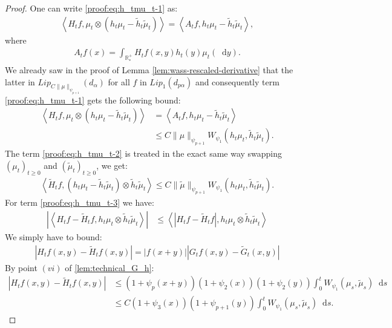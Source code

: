 \documentclass[11pt,a4paper]{article}
\newcommand{\RRP}{\mathbb{R}^+_*}
\newcommand{\Proc}[1]{\left(#1\right)_{t\geq 0}}
\newcommand{\brac}[1]{\left\langle#1\right\rangle}
\newcommand{\dd}{\mathop{}\!\mathrm{d}}
\begin{document}
\begin{proof}
    One can write \eqref{proof:eq:h_tmu_t-1} as:
    \begin{align*}
        \brac{H_tf,\mu_t \otimes\left(h_t\mu_t -  \tilde{h}_t \tilde{\mu}_t\right)} = \brac{A_tf,h_t\mu_t -  \tilde{h}_t \tilde{\mu}_t},
    \end{align*}
    where
    \begin{align*}
        A_tf(x) = \int_{\RRP} H_tf(x,y) h_t(y)\mu_t(\dd y).
    \end{align*}
    We already saw in the proof of Lemma \ref{lem:wass-rescaled-derivative} that the latter in $Lip_{C\|\mu\|_{\psi_{p+1}}}(d_{\alpha})$ for all $f$ in $Lip_1(d_{p\alpha})$ and consequently term \eqref{proof:eq:h_tmu_t-1} gets the following bound:
    \begin{align*}
        \brac{H_tf,\mu_t \otimes\left(h_t\mu_t -  \tilde{h}_t \tilde{\mu}_t\right)} &= \brac{A_tf,h_t\mu_t -  \tilde{h}_t \tilde{\mu}_t}\\
        &\leq C\| \mu\|_{\psi_{p+1}} W_{\psi_1}(h_t\mu_t, \tilde{h}_t \tilde{\mu}_t).
    \end{align*}
    The term \eqref{proof:eq:h_tmu_t-2} is treated in the exact same way swapping $\Proc{\mu_t}$ and $\Proc{\tilde{\mu}_t}$, we get:
    \begin{align*}
        \brac{\tilde{H}_tf,\left(h_t\mu_t-\tilde{h}_t\tilde{\mu}_t\right) \otimes \tilde{h}_t \tilde{\mu}_t} \leq C\| \tilde{\mu}\|_{\psi_{p+1}} W_{\psi_1}(h_t\mu_t, \tilde{h}_t \tilde{\mu}_t).
    \end{align*} 
    For term \eqref{proof:eq:h_tmu_t-3} we have:
    \begin{align*}
        \left|\brac{H_tf - \tilde{H}_tf,h_t\mu_t \otimes \tilde{h}_t \tilde{\mu}_t}\right| &\leq \brac{\left|H_tf - \tilde{H}_tf\right|,h_t\mu_t \otimes  \tilde{h}_t \tilde{\mu}_t} 
    \end{align*}
    We simply have to bound:
    \begin{align*}
        \left|H_tf(x,y) - \tilde{H}_tf(x,y)\right| = |f(x+y)|\left|G_tf(x,y) - \tilde{G}_t(x,y)\right|
    \end{align*}
    By point $(vi)$ of \ref{lem:technical_G_h}:
    \begin{align*}
        \left|H_tf(x,y) - \tilde{H}_tf(x,y)\right| &\leq \left(1 + \psi_{p}(x + y) \right)\left(1 + \psi_{2}(x) \right)\left(1 + \psi_{2}(y) \right)\int_0^t W_{\psi_1}(\mu_s,\tilde{\mu}_s)\dd s\\
        &\leq C \left(1 + \psi_{3}(x) \right) \left(1 + \psi_{p+1}(y) \right)\int_0^t W_{\psi_1}(\mu_s,\tilde{\mu}_s)\dd s.

\end{align*}
\end{proof}
\end{document}
